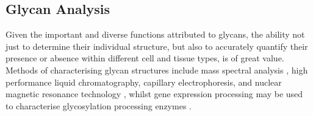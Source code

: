 \documentclass[12pt,a4paper]{article}
\begin{document}




\begin{verbatim}











\end{verbatim}



\subsection{Glycan Analysis}
\label{sec:glycan_analysis}

Given the important and diverse functions attributed to glycans, the ability not just to determine their individual structure, but also to accurately quantify their presence or absence within different cell and tissue types, is of great value. Methods of characterising glycan structures include mass spectral analysis \citep{10.1371/journal.pcbi.1002813}, high performance liquid chromatography, capillary electrophoresis, and nuclear magnetic resonance technology \citep{von2004bioinformatics}, whilst gene expression processing may be used to characterise glycosylation processing enzymes \citep{10.1371/journal.pcbi.1002813}.\\
\end{document}
